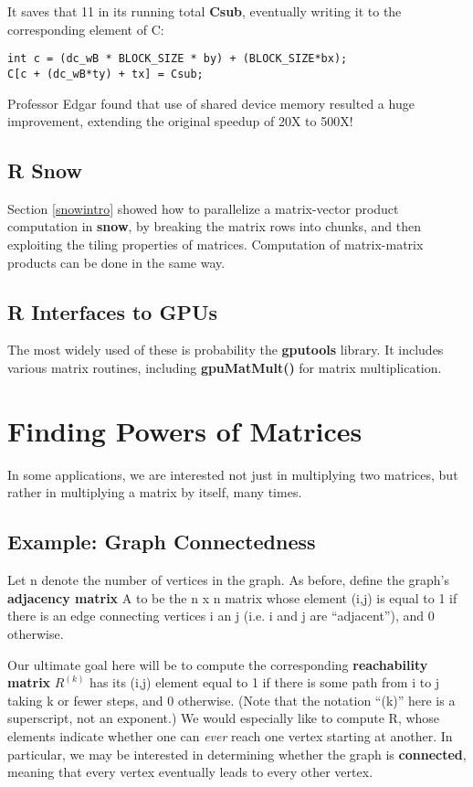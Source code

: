 It saves that 11 in its running total {\bf Csub}, eventually writing it
to the corresponding element of C:

\begin{lstlisting}
int c = (dc_wB * BLOCK_SIZE * by) + (BLOCK_SIZE*bx);
C[c + (dc_wB*ty) + tx] = Csub;
\end{lstlisting}

Professor Edgar found that use of shared device memory resulted a huge
improvement, extending the original speedup of 20X to 500X!

\subsection{R Snow}
\label{snowmult}

Section \ref{snowintro} showed how to parallelize a matrix-vector
product computation in {\bf snow}, by breaking the matrix rows into
chunks, and then exploiting the tiling properties of matrices.
Computation of matrix-matrix products can be done in the same way.

\subsection{R Interfaces to GPUs}

The most widely used of these is probability the {\bf gputools} library.
It includes various matrix routines, including {\bf gpuMatMult()} for
matrix multiplication.

\section{Finding Powers of Matrices}
\label{matpow}

In some applications, we are interested not just in multiplying two
matrices, but rather in multiplying a matrix by itself, many times.

\subsection{Example:  Graph Connectedness}

Let n denote the number of vertices in the graph.  As before, define the
graph's \textbf{adjacency matrix} A to be the n x n matrix whose element
(i,j) is equal to 1 if there is an edge connecting vertices i an j (i.e.
i and j are ``adjacent''), and 0 otherwise.  

Our ultimate goal here will be to compute the corresponding
\textbf{reachability matrix} $R^{(k)}$ has its (i,j) element equal to 1
if there is some path from i to j taking k or fewer steps, and 0
otherwise.  (Note that the notation ``(k)'' here is a superscript, not
an exponent.)  We would especially like to compute R, whose elements
indicate whether one can {\it ever} reach one vertex starting at
another. In particular, we may be interested in determining whether the
graph is {\bf connected}, meaning that every vertex eventually leads to
every other vertex.

